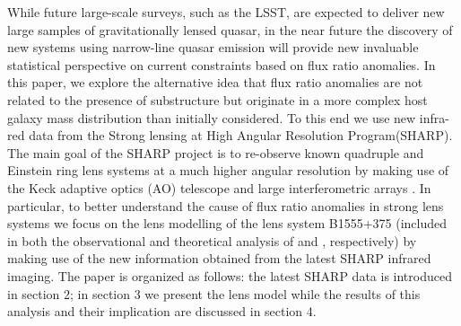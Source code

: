 \documentclass[manuscript]{emulateapj}
\newcommand{\simona}[1]{\textcolor{simonacolor}{#1}}
\begin{document}
While future large-scale surveys, such as the LSST, \simona{are expected to deliver new large samples of gravitationally lensed quasar, in the near future the discovery of new systems using} narrow-line quasar emission \citep{N14} \simona{will provide new invaluable statistical perspective on current constraints based on flux ratio anomalies. 
In this paper, we explore the alternative idea that flux ratio anomalies are not related to the presence of substructure but originate in a more complex host galaxy mass distribution than initially considered. To this end we use new infra-red data from the Strong lensing at High Angular Resolution Program(SHARP). The main goal of the SHARP} project \simona{is to re-observe} known quadruple and Einstein ring lens systems at a much higher angular resolution by making use of the Keck adaptive optics (AO) telescope and large interferometric arrays \citep{SHARP12,V12} . In particular, to better understand the cause of flux ratio anomalies in strong lens systems \simona{we focus on the lens modelling of the lens system B1555+375 (included in both the observational and theoretical analysis of  \citet{Dalal2002} and \citet{Xu14}, respectively) by making use of} the new information obtained from the latest SHARP infrared imaging. \simona{The paper is organized as follows: the latest SHARP data is introduced in section 2; in section 3 we present the lens model while the results of this analysis and their implication are discussed in section 4.}
\end{document}
